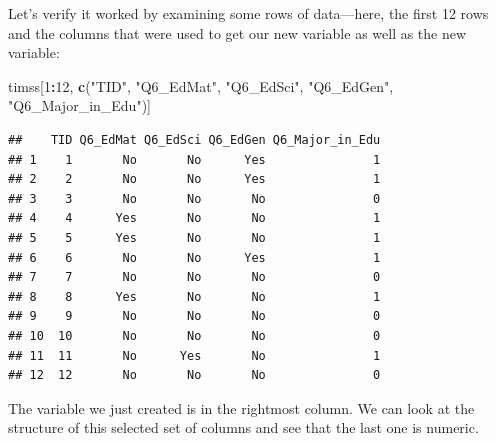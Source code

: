\documentclass[
]{article}
\newenvironment{Shaded}{\begin{snugshade}}{\end{snugshade}}
\newcommand{\DecValTok}[1]{\textcolor[rgb]{0.00,0.00,0.81}{#1}}
\newcommand{\KeywordTok}[1]{\textcolor[rgb]{0.13,0.29,0.53}{\textbf{#1}}}
\newcommand{\NormalTok}[1]{#1}
\newcommand{\OperatorTok}[1]{\textcolor[rgb]{0.81,0.36,0.00}{\textbf{#1}}}
\newcommand{\StringTok}[1]{\textcolor[rgb]{0.31,0.60,0.02}{#1}}
\begin{document}
\begin{Shaded}
\end{Shaded}

Let's verify it worked by examining some rows of data---here, the first 12 rows and the columns that were used to get our new variable as well as the new variable:

\begin{Shaded}
\begin{Highlighting}[]
\NormalTok{timss[}\DecValTok{1}\OperatorTok{:}\DecValTok{12}\NormalTok{, }\KeywordTok{c}\NormalTok{(}\StringTok{"TID"}\NormalTok{, }\StringTok{"Q6_EdMat"}\NormalTok{, }\StringTok{"Q6_EdSci"}\NormalTok{, }\StringTok{"Q6_EdGen"}\NormalTok{, }\StringTok{"Q6_Major_in_Edu"}\NormalTok{)]}
\end{Highlighting}
\end{Shaded}

\begin{verbatim}
##    TID Q6_EdMat Q6_EdSci Q6_EdGen Q6_Major_in_Edu
## 1    1       No       No      Yes               1
## 2    2       No       No      Yes               1
## 3    3       No       No       No               0
## 4    4      Yes       No       No               1
## 5    5      Yes       No       No               1
## 6    6       No       No      Yes               1
## 7    7       No       No       No               0
## 8    8      Yes       No       No               1
## 9    9       No       No       No               0
## 10  10       No       No       No               0
## 11  11       No      Yes       No               1
## 12  12       No       No       No               0
\end{verbatim}

The variable we just created is in the rightmost column. We can look at the structure of this selected set of columns and see that the last one is numeric.
\end{document}

